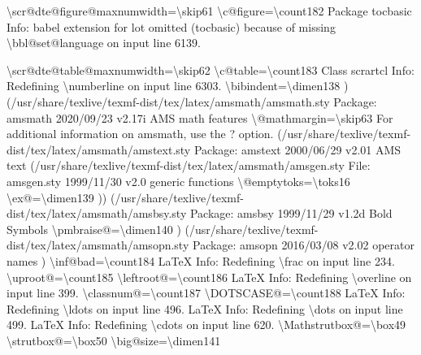 \documentclass[
  letterpaper,
  DIV=11,
  numbers=noendperiod]{scrartcl}
\newenvironment{Shaded}{\begin{snugshade}}{\end{snugshade}}
\newcommand{\NormalTok}[1]{\textcolor[rgb]{0.00,0.23,0.31}{#1}}
\begin{document}
\begin{Shaded}
\begin{Highlighting}[]
\NormalTok{\textbackslash{}scr@dte@figure@maxnumwidth=\textbackslash{}skip61}
\NormalTok{\textbackslash{}c@figure=\textbackslash{}count182}
\NormalTok{Package tocbasic Info: babel extension for \textasciigrave{}lot\textquotesingle{} omitted}
\NormalTok{(tocbasic)             because of missing \textbackslash{}bbl@set@language on input line 6139.}

\NormalTok{\textbackslash{}scr@dte@table@maxnumwidth=\textbackslash{}skip62}
\NormalTok{\textbackslash{}c@table=\textbackslash{}count183}
\NormalTok{Class scrartcl Info: Redefining \textasciigrave{}\textbackslash{}numberline\textquotesingle{} on input line 6303.}
\NormalTok{\textbackslash{}bibindent=\textbackslash{}dimen138}
\NormalTok{) (/usr/share/texlive/texmf{-}dist/tex/latex/amsmath/amsmath.sty}
\NormalTok{Package: amsmath 2020/09/23 v2.17i AMS math features}
\NormalTok{\textbackslash{}@mathmargin=\textbackslash{}skip63}
\NormalTok{For additional information on amsmath, use the \textasciigrave{}?\textquotesingle{} option.}
\NormalTok{(/usr/share/texlive/texmf{-}dist/tex/latex/amsmath/amstext.sty}
\NormalTok{Package: amstext 2000/06/29 v2.01 AMS text}
\NormalTok{(/usr/share/texlive/texmf{-}dist/tex/latex/amsmath/amsgen.sty}
\NormalTok{File: amsgen.sty 1999/11/30 v2.0 generic functions}
\NormalTok{\textbackslash{}@emptytoks=\textbackslash{}toks16}
\NormalTok{\textbackslash{}ex@=\textbackslash{}dimen139}
\NormalTok{)) (/usr/share/texlive/texmf{-}dist/tex/latex/amsmath/amsbsy.sty}
\NormalTok{Package: amsbsy 1999/11/29 v1.2d Bold Symbols}
\NormalTok{\textbackslash{}pmbraise@=\textbackslash{}dimen140}
\NormalTok{) (/usr/share/texlive/texmf{-}dist/tex/latex/amsmath/amsopn.sty}
\NormalTok{Package: amsopn 2016/03/08 v2.02 operator names}
\NormalTok{)}
\NormalTok{\textbackslash{}inf@bad=\textbackslash{}count184}
\NormalTok{LaTeX Info: Redefining \textbackslash{}frac on input line 234.}
\NormalTok{\textbackslash{}uproot@=\textbackslash{}count185}
\NormalTok{\textbackslash{}leftroot@=\textbackslash{}count186}
\NormalTok{LaTeX Info: Redefining \textbackslash{}overline on input line 399.}
\NormalTok{\textbackslash{}classnum@=\textbackslash{}count187}
\NormalTok{\textbackslash{}DOTSCASE@=\textbackslash{}count188}
\NormalTok{LaTeX Info: Redefining \textbackslash{}ldots on input line 496.}
\NormalTok{LaTeX Info: Redefining \textbackslash{}dots on input line 499.}
\NormalTok{LaTeX Info: Redefining \textbackslash{}cdots on input line 620.}
\NormalTok{\textbackslash{}Mathstrutbox@=\textbackslash{}box49}
\NormalTok{\textbackslash{}strutbox@=\textbackslash{}box50}
\NormalTok{\textbackslash{}big@size=\textbackslash{}dimen141}

\end{Highlighting}
\end{Shaded}
\end{document}
